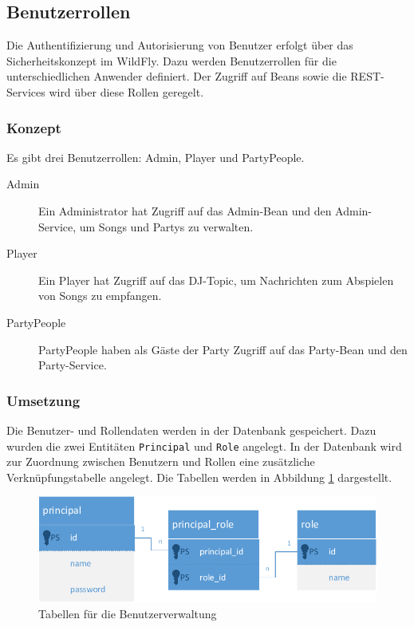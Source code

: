 \subsection{Benutzerrollen}
\label{sec:Benutzerrollen}
Die Authentifizierung und Autorisierung von Benutzer erfolgt über das Sicherheitskonzept im WildFly. Dazu werden Benutzerrollen für die unterschiedlichen Anwender definiert. Der Zugriff auf Beans sowie die REST-Services wird über diese Rollen geregelt. 

\subsubsection{Konzept}
Es gibt drei Benutzerrollen: Admin, Player und PartyPeople.
\begin{description}
	\item[Admin] Ein Administrator hat Zugriff auf das Admin-Bean und den Admin-Service, um Songs und Partys zu verwalten.
	\item[Player] Ein Player hat Zugriff auf das DJ-Topic, um Nachrichten zum Abspielen von Songs zu empfangen.
	\item[PartyPeople] PartyPeople haben als Gäste der Party Zugriff auf das Party-Bean und den Party-Service.
\end{description}

\subsubsection{Umsetzung}
Die Benutzer- und Rollendaten werden in der Datenbank gespeichert. Dazu wurden die zwei Entitäten \texttt{Principal} und \texttt{Role} angelegt. In der Datenbank wird zur Zuordnung zwischen Benutzern und Rollen eine zusätzliche Verknüpfungstabelle angelegt. Die Tabellen werden in Abbildung \ref{fig:BenutzerRollen} dargestellt.

\begin{figure}[tbh]
\centering
\includegraphics[width=1.0\linewidth]{Bilder/BenutzerRollen}
\caption{Tabellen für die Benutzerverwaltung}
\label{fig:BenutzerRollen}
\end{figure}

